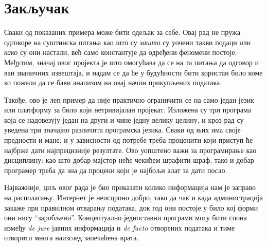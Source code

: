 \chapter{Закључак}\label{ch:\thechapter}

Сваки од показаних примера може бити одељак за себе. Овај рад не пружа одговоре на суштинска питања као што су \emph{зашто} су уочени такви подаци или \emph{како} су они настали, већ само константује да одређени феномени постоје. Међутим, значај овог пројекта је што омогућава да се на та питања да одговор и ван званичних извештаја, и надам се да ће у будућности бити користан било коме ко пожели да се бави анализом на овај начин прикупљених података.

Такође, ово је леп пример да није практично ограничити се на само један језик или платформу за било који нетривијалан пројекат. Изложена су три програма која се надовезују један на други и чине једну велику целину, и кроз рад су уведена три значајно различита програмска језика. Сваки од њих има своје предности и мане, и у зависности од потребе треба проценити који приступ ће најбрже дати најпрецизније резултате. Ово уопштено важи за програмирање као дисциплину: као што добар мајстор неће чекићем шрафити шраф, тако и добар програмер треба да зна да процени који је најбољи алат за дати посао.

Најважније, циљ овог рада је био приказати колико информација нам је заправо на располагању. Интернет је неисцрпно добро, тако да чак и када администрација закаже при правилном отварању података, док год они постоје у било кој форми они нису \enquote{заробљени}. Концептуално једноставни програми могу бити спона између \emph{de jure} јавних информација и \emph{de facto} отворених података и тиме отворити многа наизглед запечаћена врата.